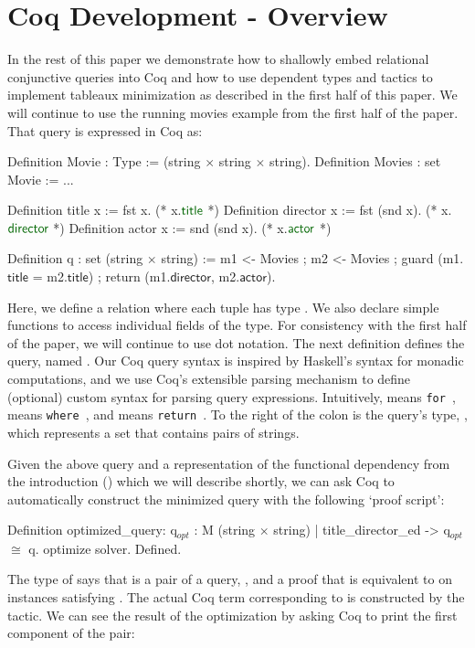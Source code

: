 \documentclass{sigplanconf}
\newcommand{\FOR}{{\tt for}\relax\ifmmode\ \else\xspace\fi}
\newcommand{\WHERE}{{\tt where}\relax\ifmmode\ \else\xspace\fi}
\newcommand{\RETURN}{{\tt return}\relax\ifmmode\ \else\xspace\fi}
\begin{document}
\section{Coq Development - Overview}

In the rest of this paper we demonstrate how to shallowly embed relational conjunctive queries into Coq and how to use dependent types and tactics to implement tableaux minimization as described in the first half of this paper.  We will continue to use the running movies example from the first half of the paper.  That query is expressed in Coq as:
\begin{coq}
Definition Movie : Type := (string $\times$ string $\times$ string).
Definition Movies : set Movie := ...

Definition title x := fst x. (* x.$\textcolor{dkgreen}{\textsf{title}}$ *)
Definition director x := fst (snd x). (* x.$\textcolor{dkgreen}{\textsf{director}}$ *)
Definition actor x := snd (snd x). (* x.$\textcolor{dkgreen}{\textsf{actor}}$ *)

Definition q : set (string $\times$ string) :=
  m1 <- Movies ; m2 <- Movies ;
  guard (m1.$\textsf{title}$ = m2.$\textsf{title}$) ;
  return (m1.$\textsf{director}$, m2.$\textsf{actor}$).
\end{coq}
Here, we define a relation  where each tuple has type .
We also declare simple functions to access individual fields of the  type.
For consistency with the first half of the paper, we will continue to use dot notation.
The next definition defines the query, named .
Our Coq query syntax is inspired by Haskell's syntax for monadic computations, and we use Coq's extensible parsing mechanism to define (optional) custom syntax for parsing query expressions.
Intuitively, \coqe{<-} means \FOR,  means \WHERE, and  means \RETURN.
To the right of the colon is the query's type, , which represents a set that contains pairs of strings.


Given the above query and a representation of the functional dependency from the introduction () which we will describe shortly, we can ask Coq to automatically construct the minimized query with the following `proof script':
\begin{coq}
Definition optimized_query:
{q$_{opt}$ : M (string $\times$ string) | title_director_ed -> q$_{opt}$ $\cong$ q}.
optimize solver.
Defined.
\end{coq}
The type of  says that  is a pair of a query, , and a proof that  is equivalent to  on instances satisfying .
The actual Coq term corresponding to  is constructed by the  tactic.  We can see the result of the optimization by asking Coq to print the first component of the pair: \\
\end{document}
